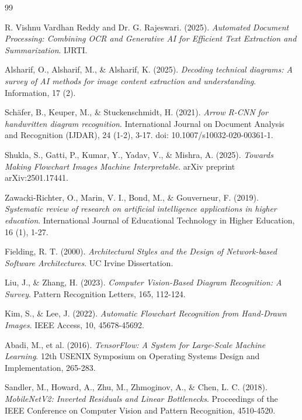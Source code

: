 \renewcommand{\bibname}{References}

\begin{thebibliography}{99}

R. Vishnu Vardhan Reddy and Dr. G. Rajeswari. (2025). \textit{Automated Document Processing: Combining OCR and Generative AI for Efficient Text Extraction and Summarization}. IJRTI.

Alsharif, O., Alsharif, M., \& Alsharif, K. (2025). \textit{Decoding technical diagrams: A survey of AI methods for image content extraction and understanding}. Information, 17 (2). 

Schäfer, B., Keuper, M., \& Stuckenschmidt, H. (2021). \textit{Arrow R-CNN for handwritten diagram recognition}. International Journal on Document Analysis and Recognition (IJDAR), 24 (1-2), 3-17. doi: 10.1007/s10032-020-00361-1.

Shukla, S., Gatti, P., Kumar, Y., Yadav, V., \& Mishra, A. (2025). 
\textit{Towards Making Flowchart Images Machine Interpretable}. arXiv preprint arXiv:2501.17441.

Zawacki-Richter, O., Marin, V. I., Bond, M., \& Gouverneur, F. (2019). \textit{Systematic review of research on artificial intelligence applications in higher education}. International Journal of Educational Technology in Higher Education, 16 (1), 1-27.

Fielding, R. T. (2000). \textit{Architectural Styles and the Design of Network-based Software Architectures}. UC Irvine Dissertation.

Liu, J., \& Zhang, H. (2023). \textit{Computer Vision-Based Diagram Recognition: A Survey}. Pattern Recognition Letters, 165, 112-124.

Kim, S., \& Lee, J. (2022). \textit{Automatic Flowchart Recognition from Hand-Drawn Images}. IEEE Access, 10, 45678-45692.

Abadi, M., et al. (2016). \textit{TensorFlow: A System for Large-Scale Machine Learning}. 12th USENIX Symposium on Operating Systems Design and Implementation, 265-283.

Sandler, M., Howard, A., Zhu, M., Zhmoginov, A., \& Chen, L. C. (2018). \textit{MobileNetV2: Inverted Residuals and Linear Bottlenecks}. Proceedings of the IEEE Conference on Computer Vision and Pattern Recognition, 4510-4520.


\end{thebibliography}
